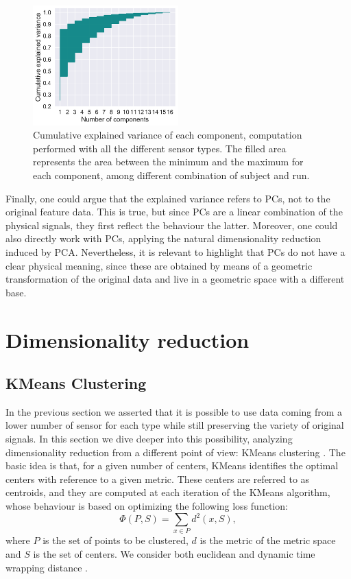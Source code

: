 \documentclass[10pt, a4paper, twocolumn]{article}
\theoremstyle{definition}
\begin{document}
\begin{figure} \centering
         \includegraphics[width=0.5\textwidth]{../pca/pca_results/fill_global_ex_var.pdf}
    \caption{Cumulative explained variance of each component, computation performed with all the different sensor types. The filled area represents the area between the minimum and the maximum for each component, among different combination of subject and run. }\label{fig:pca_het}
\end{figure}
\vspace{0.2cm}
\par
Finally, one could argue that the explained variance refers to PCs, not to the original feature data. This is true, but since PCs are a linear combination of the physical signals, they first reflect the behaviour the latter. Moreover, one could also directly work with PCs, applying the natural dimensionality reduction induced by PCA. Nevertheless, it is relevant to highlight that PCs do not have a clear physical meaning, since these are obtained by means of a geometric transformation of the original data and live in a geometric space with a different base. 

\section{Dimensionality reduction}

\subsection{KMeans Clustering}
In the previous section we asserted that it is possible to use data coming from a lower number of sensor for each type while still preserving the variety of original signals. In this section we dive deeper into this possibility, analyzing dimensionality reduction from a different point of view: KMeans clustering \cite{kmeans} \cite{JMLR:v21:20-091}. The basic idea is that, for a given number of centers, KMeans identifies the optimal centers with reference to a given metric. These centers are referred to as centroids, and they are computed at each iteration of the KMeans algorithm, whose behaviour is based on optimizing the following loss function:
\begin{equation}
\Phi(P,S) = \sum_{x\in P} d^2(x,S),
\end{equation}
where $P$ is the set of points to be clustered, $d$ is the metric of the metric space and $S$ is the set of centers. We consider both euclidean and dynamic time wrapping distance \cite{dtw}.
\end{document}
